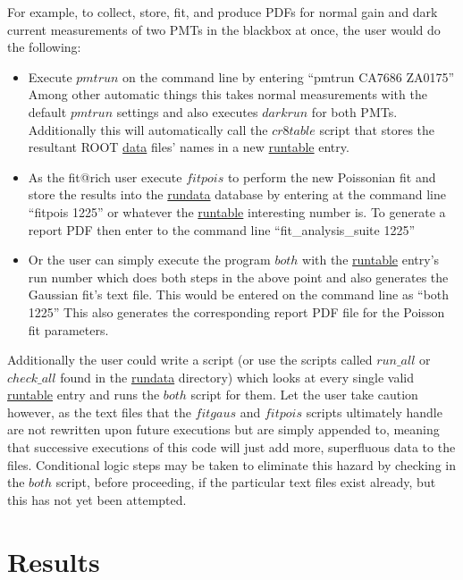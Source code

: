 \documentclass[prc,twocolumn]{revtex4}
\begin{document}
		For example, to collect, store, fit, and produce PDFs for normal gain and dark current measurements of two PMTs in the blackbox at once, the user would do the following:
		\begin{itemize}
			\item Execute $pmtrun$ on the command line by entering ``pmtrun CA7686 ZA0175''
				\subitem Among other automatic things this takes normal measurements with the default $pmtrun$ settings and also executes $darkrun$ for both PMTs.
				\subitem Additionally this will automatically call the $cr8table$ script that stores the resultant ROOT \underline{data} files' names in a new \underline{runtable} entry.
			\item As the fit@rich user execute $fitpois$ to perform the new Poissonian fit and store the results into the \underline{rundata} database by entering at the command line ``fitpois 1225'' or whatever the \underline{runtable} interesting number is. 
			\subitem To generate a report PDF then enter to the command line ``fit\_analysis\_suite 1225''
			\item Or the user can simply execute the program $both$ with the \underline{runtable} entry's run number which does both steps in the above point and also generates the Gaussian fit's text file. This would be entered on the command line as ``both 1225''
			\subitem This also generates the corresponding report PDF file for the Poisson fit parameters.
		\end{itemize}
		Additionally the user could write a script (or use the scripts called $run\_all$ or $check\_all$ found in the \underline{rundata} directory) which looks at every single valid \underline{runtable} entry and runs the $both$ script for them. Let the user take caution however, as the text files that the $fitgaus$ and $fitpois$ scripts ultimately handle are not rewritten upon future executions but are simply appended to, meaning that successive executions of this code will just add more, superfluous data to the files.  Conditional logic steps may be taken to eliminate this hazard by checking in the $both$ script, before proceeding, if the particular text files exist already, but this has not yet been attempted.
		
\section{Results}
\end{document}
